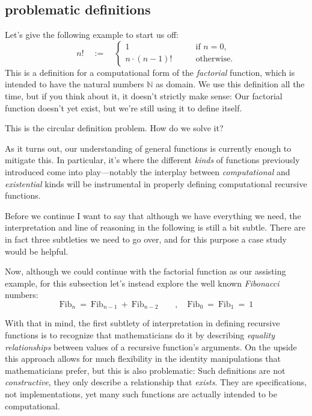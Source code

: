 \documentclass[twoside]{article}
\begin{document}
\subsection*{problematic definitions}

Let's give the following example to start us off:
$$ n! \quad := \quad \left\{\begin{array}{ll}
1 & \qquad \mbox{if } n = 0,				\\
n \cdot (n-1)! & \qquad \mbox{otherwise.}
\end{array}\right. $$
This is a definition for a computational form of the \emph{factorial} function, which is intended to have the natural
numbers $ \mathbb{N} $ as domain. We use this definition all the time, but if you think about it, it doesn't strictly
make sense: Our factorial function doesn't yet exist, but we're still using it to define itself.

This is the circular definition problem. How do we solve it?

As it turns out, our understanding of general functions is currently enough to mitigate this. In particular, it's
where the different \emph{kinds} of functions previously introduced come into play---notably the interplay between
\emph{computational} and \emph{existential} kinds will be instrumental in properly defining computational recursive
functions.

Before we continue I want to say that although we have everything we need, the interpretation and line of reasoning
in the following is still a bit subtle. There are in fact three subtleties we need to go over, and for this purpose
a case study would be helpful.

Now, although we could continue with the factorial function as our assisting example,
for this subsection let's instead explore the well known \emph{Fibonacci} numbers:
$$ \mbox{Fib}_n\ =\ \mbox{Fib}_{n-1}\ +\ \mbox{Fib}_{n-2} \qquad , \quad \mbox{Fib}_0\ =\ \mbox{Fib}_1\ =\ 1 $$

With that in mind, the first subtlety of interpretation in defining recursive functions is to recognize that mathematicians
do it by describing \emph{equality relationships} between values of a recursive function's arguments. On the upside this
approach allows for much flexibility in the identity manipulations that mathematicians prefer, but this is also problematic:
Such definitions are not \emph{constructive}, they only describe a relationship that \emph{exists}. They are specifications,
not implementations, yet many such functions are actually intended to be computational.
\end{document}
